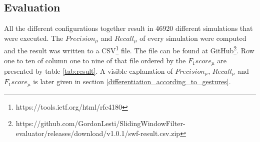 \subsection{Evaluation} \label{evaluation}
All the different configurations together result in 46920 different simulations that were executed. The
$Precision_{\mu}$ and $Recall_{\mu}$ of every simulation were computed and the result was written to a
CSV\footnote{https://tools.ietf.org/html/rfc4180} file. The file can be found at
GitHub\footnote{https://github.com/GordonLesti/SlidingWindowFilter-evaluator/releases/download/v1.0.1/swf-result.csv.zip}.
Row one to ten of column one to nine of that file ordered by the $F_{1}score_{\mu}$ are presented by table
\ref{tab:result}. A visible explanation of $Precision_{\mu}$, $Recall_{\mu}$ and $F_{1}score_{\mu}$ is later given in
section \ref{differentiation_according_to_gestures}.

